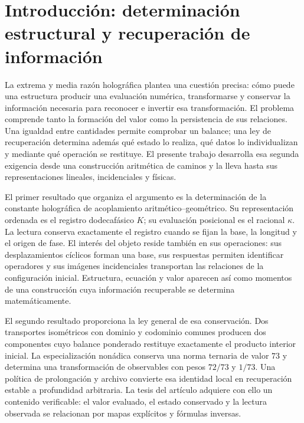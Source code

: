 \section*{Introducción: determinación estructural y recuperación de información}
\label{libro:prologo}
La extrema y media razón holográfica plantea una cuestión precisa: cómo puede una estructura producir una evaluación numérica, transformarse y conservar la información necesaria para reconocer e invertir esa transformación. El problema comprende tanto la formación del valor como la persistencia de sus relaciones. Una igualdad entre cantidades permite comprobar un balance; una ley de recuperación determina además qué estado lo realiza, qué datos lo individualizan y mediante qué operación se restituye. El presente trabajo desarrolla esa segunda exigencia desde una construcción aritmética de caminos y la lleva hasta sus representaciones lineales, incidenciales y físicas.

El primer resultado que organiza el argumento es la determinación de la constante holográfica de acoplamiento aritmético--geométrico. Su representación ordenada es el registro dodecafásico \(K\); su evaluación posicional es el racional \(\kappa\). La lectura conserva exactamente el registro cuando se fijan la base, la longitud y el origen de fase. El interés del objeto reside también en sus operaciones: sus desplazamientos cíclicos forman una base, sus respuestas permiten identificar operadores y sus imágenes incidenciales transportan las relaciones de la configuración inicial. Estructura, ecuación y valor aparecen así como momentos de una construcción cuya información recuperable se determina matemáticamente.

El segundo resultado proporciona la ley general de esa conservación. Dos transportes isométricos con dominio y codominio comunes producen dos componentes cuyo balance ponderado restituye exactamente el producto interior inicial. La especialización nonádica conserva una norma ternaria de valor \(73\) y determina una transformación de observables con pesos \(72/73\) y \(1/73\). Una política de prolongación y archivo convierte esa identidad local en recuperación estable a profundidad arbitraria. La tesis del artículo adquiere con ello un contenido verificable: el valor evaluado, el estado conservado y la lectura observada se relacionan por mapas explícitos y fórmulas inversas.

